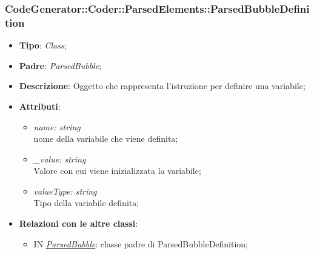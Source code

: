 \documentclass[../DefinizioneDiProdotto.tex]{subfiles}
\begin{document}
				\subsubsection{CodeGenerator::Coder::ParsedElements::ParsedBubbleDefinition}
			\hypertarget{SWEDesigner::Server::CodeGenerator::Coder::ParsedElements::ParsedBubbleDefinition}{}
			\begin{itemize}
				\item \textbf{Tipo}: \emph{Class};
				\item \textbf{Padre}: \emph{ParsedBubble};
				\item \textbf{Descrizione}: Oggetto che rappresenta l'istruzione per definire una variabile;
				\item \textbf{Attributi}:
				\begin{itemize}
					\item \emph{name: string} \\
					nome della variabile che viene definita;
					\item \emph{\_value: string} \\
					Valore con cui viene inizializzata la variabile;
					\item \emph{valueType: string} \\
					Tipo della variabile definita;
				\end{itemize}
				\item \textbf{Relazioni con le altre classi}:	
				\begin{itemize}
					\item IN \hyperlink{SWEDesigner::Server::CodeGenerator::Coder::ParsedElements::ParsedBubble}{\emph{ParsedBubble}}: classe padre di ParsedBubbleDefinition; 
				\end{itemize}
			\end{itemize}
		
\end{document}
